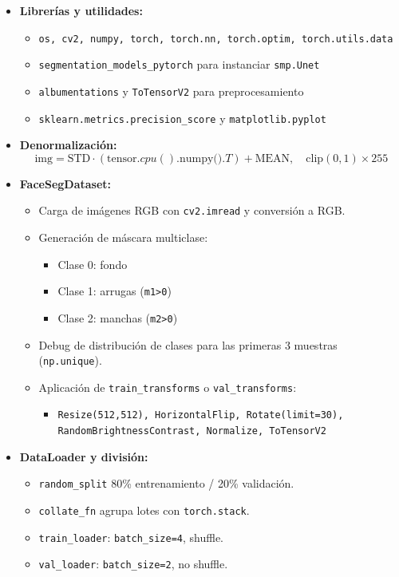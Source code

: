 \begin{itemize}
  \item \textbf{Librerías y utilidades:}
    \begin{itemize}
      \item \texttt{os, cv2, numpy, torch, torch.nn, torch.optim, torch.utils.data}
      \item \texttt{segmentation\_models\_pytorch} para instanciar \texttt{smp.Unet}
      \item \texttt{albumentations} y \texttt{ToTensorV2} para preprocesamiento
      \item \texttt{sklearn.metrics.precision\_score} y \texttt{matplotlib.pyplot}
    \end{itemize}

  \item \textbf{Denormalización:}
    \[
      \text{img} = \text{STD}\cdot(\text{tensor}.cpu().\text{numpy()}.T) + \text{MEAN},\quad
      \text{clip}(0,1)\times255
    \]

  \item \textbf{FaceSegDataset:}
    \begin{itemize}
      \item Carga de imágenes RGB con \texttt{cv2.imread} y conversión a RGB.
      \item Generación de máscara multiclase:
        \begin{itemize}
          \item Clase 0: fondo
          \item Clase 1: arrugas (\texttt{m1>0})
          \item Clase 2: manchas (\texttt{m2>0})
        \end{itemize}
      \item Debug de distribución de clases para las primeras 3 muestras (\texttt{np.unique}).
      \item Aplicación de \texttt{train\_transforms} o \texttt{val\_transforms}:
        \begin{itemize}
          \item \texttt{Resize(512,512), HorizontalFlip, Rotate(limit=30), RandomBrightnessContrast, Normalize, ToTensorV2}
        \end{itemize}
    \end{itemize}

  \item \textbf{DataLoader y división:}
    \begin{itemize}
      \item \texttt{random\_split} 80\% entrenamiento / 20\% validación.
      \item \texttt{collate\_fn} agrupa lotes con \texttt{torch.stack}.
      \item \texttt{train\_loader}: \texttt{batch\_size=4}, shuffle.
      \item \texttt{val\_loader}: \texttt{batch\_size=2}, no shuffle.
    \end{itemize}
\end{itemize}

